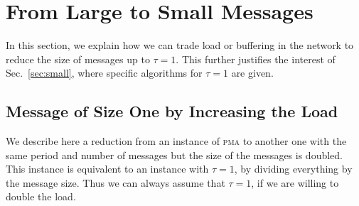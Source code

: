\documentclass[a4paper,UKenglish,cleveref, autoref, thm-restate]{lipics-v2019}
\newcommand\pma{\textsc{pma}\xspace}
\begin{document}
\section{From Large to Small Messages}\label{sec:reduction}


In this section, we explain how we can trade load or buffering in the network to reduce the size of messages up to $\tau = 1$. This further justifies the interest of Sec.~\ref{sec:small}, where specific algorithms for $\tau = 1$ are given.

\subsection{Message of Size One by Increasing the Load}

We describe here a reduction from an instance of \pma to another one with the same period and number of messages but 
the size of the messages is doubled. This instance is equivalent to an instance with $\tau = 1$, by dividing everything by the message size. Thus we can always assume that $\tau = 1$, if we are willing to double the load.
\end{document}
